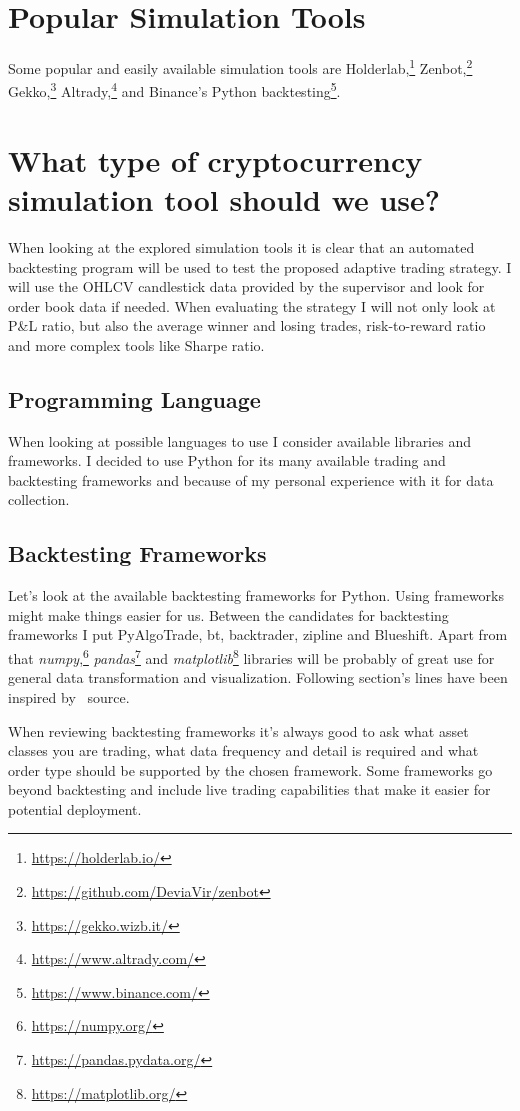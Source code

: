 \section{Popular Simulation Tools}
Some popular and easily available simulation tools are Holderlab,\footnote{\url{https://holderlab.io/}} Zenbot,\footnote{\url{https://github.com/DeviaVir/zenbot}} Gekko,\footnote{\url{https://gekko.wizb.it/}} Altrady,\footnote{\url{https://www.altrady.com/}} and Binance's Python backtesting\footnote{\url{https://www.binance.com/}}.

\section{What type of cryptocurrency simulation tool should we use?}
When looking at the explored simulation tools it is clear that an automated backtesting program will be used to test the proposed adaptive trading strategy. I will use the OHLCV candlestick data provided by the supervisor and look for order book data if needed. When evaluating the strategy I will not only look at P\&L ratio, but also the average winner and losing trades, risk-to-reward ratio and more complex tools like Sharpe ratio.

\subsection*{Programming Language}
When looking at possible languages to use I consider available libraries and frameworks. I decided to use Python for its many available trading and backtesting frameworks and because of my personal experience with it for data collection.

\subsection*{Backtesting Frameworks}
Let's look at the available backtesting frameworks for Python. Using frameworks might make things easier for us. Between the candidates for backtesting frameworks I put PyAlgoTrade, bt, backtrader, zipline and Blueshift. Apart from that \emph{numpy},\footnote{\url{https://numpy.org/}} \emph{pandas}\footnote{\url{https://pandas.pydata.org/}} and \emph{matplotlib}\footnote{\url{https://matplotlib.org/}} libraries will be probably of great use for general data transformation and visualization. Following section's lines have been inspired by~\cite{python-backtesting-frameworks} source.

When reviewing backtesting frameworks it's always good to ask what asset classes you are trading, what data frequency and detail is required and what order type should be supported by the chosen framework. Some frameworks go beyond backtesting and include live trading capabilities that make it easier for potential deployment.

